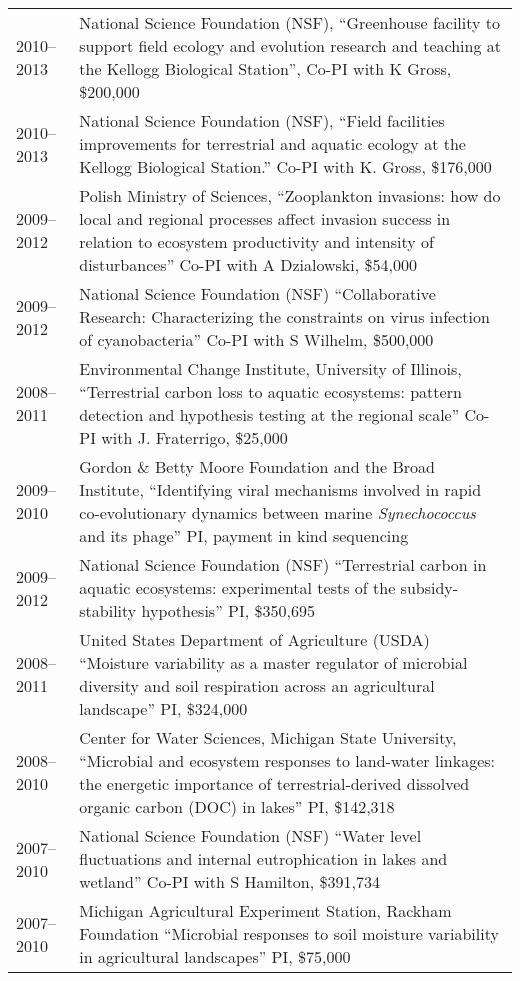 \documentclass[11pt]{article}  %
\begin{document}
\begin{tabularx}{\textwidth}{@{}l@{\hspace{2em}}X@{}}
2010--2013 & National Science Foundation (NSF), “Greenhouse facility to support field ecology and evolution research and teaching at the Kellogg Biological Station”, Co-PI with K Gross, \$200,000 \\
2010--2013 & National Science Foundation (NSF), “Field facilities improvements for terrestrial and aquatic ecology at the Kellogg Biological Station.” Co-PI with K. Gross, \$176,000 \\
2009--2012 & Polish Ministry of Sciences, “Zooplankton invasions: how do local and regional processes affect invasion success in relation to ecosystem productivity and intensity of disturbances” Co-PI with A Dzialowski, \$54,000 \\
2009--2012 & National Science Foundation (NSF) “Collaborative Research: Characterizing the constraints on virus infection of cyanobacteria” Co-PI with S Wilhelm, \$500,000 \\
2008--2011 & Environmental Change Institute, University of Illinois, “Terrestrial carbon loss to aquatic ecosystems: pattern detection and hypothesis testing at the regional scale” Co-PI with J. Fraterrigo, \$25,000 \\
2009--2010 & Gordon \& Betty Moore Foundation and the Broad Institute, “Identifying viral mechanisms involved in rapid co-evolutionary dynamics between marine \textit{Synechococcus} and its phage” PI, payment in kind sequencing \\
2009--2012 & National Science Foundation (NSF) “Terrestrial carbon in aquatic ecosystems: experimental tests of the subsidy-stability hypothesis” PI, \$350,695 \\
2008--2011 & United States Department of Agriculture (USDA) “Moisture variability as a master regulator of microbial diversity and soil respiration across an agricultural landscape” PI, \$324,000 \\
2008--2010 & Center for Water Sciences, Michigan State University, “Microbial and ecosystem responses to land-water linkages: the energetic importance of terrestrial-derived dissolved organic carbon (DOC) in lakes” PI, \$142,318 \\
2007--2010 & National Science Foundation (NSF) “Water level fluctuations and internal eutrophication in lakes and wetland” Co-PI with S Hamilton, \$391,734 \\
2007--2010 & Michigan Agricultural Experiment Station, Rackham Foundation “Microbial responses to soil moisture variability in agricultural landscapes” PI, \$75,000 \\

\end{tabularx}
\end{document}
